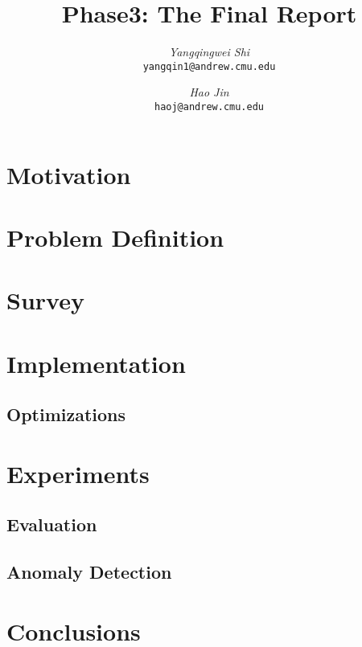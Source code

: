 \documentclass[12pt]{article}
\begin{document}
\newcommand{\beq}{\begin{equation}}
\newcommand{\eeq}{\end{equation}}
\newcommand{\bit}{\begin{itemize*}}
\newcommand{\eit}{\end{itemize*}}
\newcommand{\goal}[1]{ {\noindent {$\Rightarrow$} \em {#1} } }
\newcommand{\hide}[1]{}
\newcommand{\comment}[1]{ {\footnotesize {#1} } }
\newtheorem{lemma}{Lemma}
\newtheorem{theorem}{Theorem}
\newtheorem{proof}{Proof}
\newtheorem{defn}{Definition}
\newtheorem{algo}{Algorithm}
\newtheorem{observation}{Observation}

\title{Phase3: The Final Report}


\author{ {\em Yangqingwei Shi} \\	   
	    {\tt yangqin1@andrew.cmu.edu}
	 \and
	 {\em Hao Jin} \\
	     {\tt haoj@andrew.cmu.edu}}
\maketitle

\section{Motivation}
    \label{sec:intro}
    
\newpage
\section{Problem Definition}
    \label{sec:problem}
    
\newpage
\section{Survey}
    \label{sec:survey}
    
	   
\newpage
\section{Implementation}
\subsection{Optimizations}
	\label{sec:imp}
	
	
\newpage
\section{Experiments}
\subsection{Evaluation}
	\label{sec:expeval}
	
\newpage
\subsection{Anomaly Detection}
	\label{sec:expanal}
	

\newpage
\section{Conclusions}
	\label{sec:concl}
	


\newpage




\newpage
{}
\end{document}
